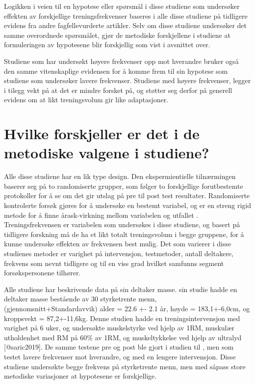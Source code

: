 \documentclass[
]{book}
\begin{document}
Logikken i veien til en hypotese eller spørsmål i disse studiene som undersøker effekten av forskjellige treningsfrekvenser baseres i alle disse studiene på tidligere evidens fra andre fagfellevurderte artikler\citep{brigatto2019, gentil2018, johnsen2021, saric2019, lasevicius2019}. Selv om disse studiene undersøker det samme overordnede spørsmålet, gjør de metodiske forskjellene i studiene at formuleringen av hypotesene blir forskjellig som vist i avsnittet over.

Studiene som har undersøkt høyere frekvenser opp mot hverandre \citep{johnsen2021, saric2019} bruker også den samme vitenskaplige evidensen for å komme frem til sin hypotese som studiene som undersøker lavere frekvenser\citep{brigatto2019, gentil2018, lasevicius2019}. Studiene med høyere frekvenser, legger i tilegg vekt på at det er mindre forsket på, og støtter seg derfor på generell evidens om at likt treningsvolum gir like adaptasjoner\citep{johnsen2021, saric2019}.

\hypertarget{hvilke-forskjeller-er-det-i-de-metodiske-valgene-i-studiene}{%
\section{Hvilke forskjeller er det i de metodiske valgene i studiene?}\label{hvilke-forskjeller-er-det-i-de-metodiske-valgene-i-studiene}}

Alle disse studiene har en lik type design. Den ekspermientielle tilnærmingen baserer seg på to randomiserte grupper, som følger to forskjellige forutbestemte protokoller for å se om det gir utslag på pre til post test resultater. Randomiserte kontrolerte forsøk gjøres for å undersøke en bestemt variabel, og er en streng rigid metode for å finne årask-virkning mellom variabelen og utfallet \citep{sibbald1998}. Treningsfrekvensen er variabelen som undersøkes i disse studiene, og basert på tidligere forskning må de ha et likt totalt treningsvolum i begge gruppene, for å kunne undersøke effekten av frekvensen best mulig. Det som varierer i disse studienes metoder er varighet på intervensjon, testmetoder, antall deltakere, frekvens som nevnt tidligere og til en viss grad hvilket samfunns segment forsøkspersonene tilhører.

Alle studiene har beskrivende data på sin deltaker masse. \citep{saric2019} sin studie hadde en deltaker masse bestående av 30 styrketrente menn, (gjennomsnitt+Standardavvik) alder = 22.6 +- 2.1 år, høyde = 183,1+-6,0cm, og kroppsvekt = 87,2+-11,6kg. Denne studien hadde en treningsintervensjon med varighet på 6 uker, og undersøkte muskelstyrke ved hjelp av 1RM, muskulær utholdenhet med RM på 60\% av 1RM, og muskeltykkelse ved hjelp av ultralyd {[}@saric2019{]}. De samme testene pre og post ble gjort i studien til \citep{brigatto2019}, men som testet lavere frekvenser mot hverandre, og med en lengere intervensjon. Disse studiene undersøkte begge frekvens på styrketrente menn, men med såpass store metodiske variasjoner at hypotesene er forskjellige.
\end{document}
